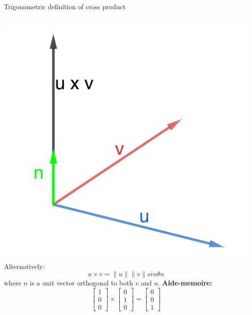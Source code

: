 \documentclass{beamer}
\begin{document}
\begin{frame}{Trigonometric definition of cross product}
\begin{columns}
  \includegraphics{cross-product-direction.png}
  Alternatively:
  \begin{equation*}
  u\times v = \|u\|\|v\| sin\theta n
  \end{equation*}
  where $n$ is a unit vector orthogonal to both $v$ and $u$.\vfill
  {\bf Aide-memoire:}
  \begin{equation*}
  \left[
  \begin{array}{c}
  1\\
  0\\
  0
  \end{array}
  \right]\times \left[
  \begin{array}{c}
  0\\
  1\\
  0
  \end{array}
  \right] = \left[
  \begin{array}{c}
  0\\
  0\\
  1
  \end{array}
  \right]
  \end{equation*}
\end{columns}
\end{frame}
\end{document}
